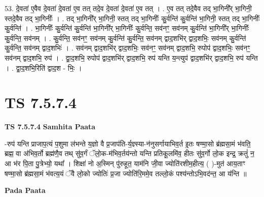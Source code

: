 \documentclass[17pt]{extarticle}
\begin{document}
53. दे॒वता॑ ए॒वैव दे॒वता॑ दे॒वता॑ ए॒व तत् तदे॒व दे॒वता॑ दे॒वता॑ ए॒व तत् । . ए॒व तत् तदे॒वैव तद् भा॒गिनी᳚र् भा॒गिनी॒ स्तदे॒वैव तद् भा॒गिनीः᳚ । . तद् भा॒गिनी᳚र् भा॒गिनी॒ स्तत् तद् भा॒गिनीः᳚ कु॒र्वन्ति॑ कु॒र्वन्ति॑ भा॒गिनी॒ स्तत् तद् भा॒गिनीः᳚ कु॒र्वन्ति॑ । . भा॒गिनीः᳚ कु॒र्वन्ति॑ कु॒र्वन्ति॑ भा॒गिनी᳚र् भा॒गिनीः᳚ कु॒र्वन्ति॒ सव॑नꣳ॒॒ सव॑नम् कु॒र्वन्ति॑ भा॒गिनी᳚र् भा॒गिनीः᳚ कु॒र्वन्ति॒ सव॑नम् । . कु॒र्वन्ति॒ सव॑नꣳ॒॒ सव॑नम् कु॒र्वन्ति॑ कु॒र्वन्ति॒ सव॑नम् द्वाद॒शभि॑र् द्वाद॒शभिः॒ सव॑नम् कु॒र्वन्ति॑ कु॒र्वन्ति॒ सव॑नम् द्वाद॒शभिः॑ । . सव॑नम् द्वाद॒शभि॑र् द्वाद॒शभिः॒ सव॑नꣳ॒॒ सव॑नम् द्वाद॒शभि॒ रुपोप॑ द्वाद॒शभिः॒ सव॑नꣳ॒॒ सव॑नम् द्वाद॒शभि॒ रुप॑ । . द्वा॒द॒शभि॒ रुपोप॑ द्वाद॒शभि॑र् द्वाद॒शभि॒ रुप॑ यन्ति य॒न्त्युप॑ द्वाद॒शभि॑र् द्वाद॒शभि॒ रुप॑ यन्ति । . द्वा॒द॒शभि॒रिति॑ द्वाद॒श - भिः॒ । \newline
\pagebreak
{}

\section{ TS 7.5.7.4 }

\textbf{TS 7.5.7.4 } \newline
\textbf{Samhita Paata} \newline

-रुप॑ यन्ति प्राजाप॒त्यं प॒शुमा ल॑भन्ते य॒ज्ञो वै प्र॒जाप॑ति-र्य॒ज्ञ्स्या-न॑नुसर्गायाभिव॒र्त इ॒तः षण्मा॒सो ब्र॑ह्मसा॒मं भ॑वति॒ ब्रह्म॒ वा अ॑भिव॒र्तो ब्रह्म॑णै॒व तथ् सु॑व॒र्गं ॅलो॒क-म॑भिव॒र्तय॑न्तो यन्ति प्रतिकू॒लमि॑व॒ हीतः सु॑व॒र्गो लो॒क इन्द्र॒ क्रतुं॑ न॒ आ भ॑र पि॒ता पु॒त्रेभ्यो॒ यथा᳚ । शिक्षा॑ नो अ॒स्मिन् पु॑रुहूत॒ याम॑नि जी॒वा ज्योति॑रशीम॒हीत्य॒ ( )-मुत॑ आय॒ताꣳ षण्मा॒सो ब्र॑ह्मसा॒मं भ॑वत्य॒यं ॅवै लो॒को ज्योतिः॑ प्र॒जा ज्योति॑रि॒ममे॒व तल्लो॒कं पश्य॑न्तोऽभि॒वद॑न्त॒ आ य॑न्ति ॥ \newline

\textbf{Pada Paata} \newline
\end{document}
